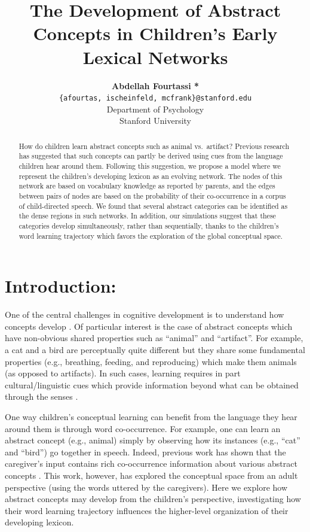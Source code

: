\documentclass[11pt]{article}
\title{The Development of Abstract Concepts in Children's Early Lexical
Networks}
\author{{\large \bf Abdellah Fourtassi *}  \qquad {\large \bf Isaac L. Scheinfeld *} \qquad {\large \bf Michael C. Frank} \\ \texttt{\{afourtas, ischeinfeld, mcfrank\}@stanford.edu} \\ Department of Psychology \\ Stanford University}
\date{}
\begin{document}
\maketitle

\begin{abstract}
How do children learn abstract concepts such as animal vs.~artifact?
Previous research has suggested that such concepts can partly be derived
using cues from the language children hear around them. Following this
suggestion, we propose a model where we represent the children's
developing lexicon as an evolving network. The nodes of this network are
based on vocabulary knowledge as reported by parents, and the edges
between pairs of nodes are based on the probability of their
co-occurrence in a corpus of child-directed speech. We found that
several abstract categories can be identified as the dense regions in
such networks. In addition, our simulations suggest that these
categories develop simultaneously, rather than sequentially, thanks to
the children's word learning trajectory which favors the exploration of
the global conceptual space.
\end{abstract}

\section{Introduction:}\label{introduction}

One of the central challenges in cognitive development is to understand
how concepts develop \cite{carey2009,keil1992,gopnik1997}. Of particular
interest is the case of abstract concepts which have non-obvious shared
properties such as ``animal'' and ``artifact''. For example, a cat and a
bird are perceptually quite different but they share some fundamental
properties (e.g., breathing, feeding, and reproducing) which make them
animals (as opposed to artifacts). In such cases, learning requires in
part cultural/linguistic cues which provide information beyond what can
be obtained through the senses \cite{gelman2009,harris2012,csibra2009}.

One way children's conceptual learning can benefit from the language
they hear around them is through word co-occurrence. For example, one
can learn an abstract concept (e.g., animal) simply by observing how its
instances (e.g., ``cat'' and ``bird'') go together in speech. Indeed,
previous work has shown that the caregiver's input contains rich
co-occurrence information about various abstract concepts
\cite{huebner2018}. This work, however, has explored the conceptual
space from an adult perspective (using the words uttered by the
caregivers). Here we explore how abstract concepts may develop from the
children's perspective, investigating how their word learning trajectory
influences the higher-level organization of their developing lexicon.
\end{document}
